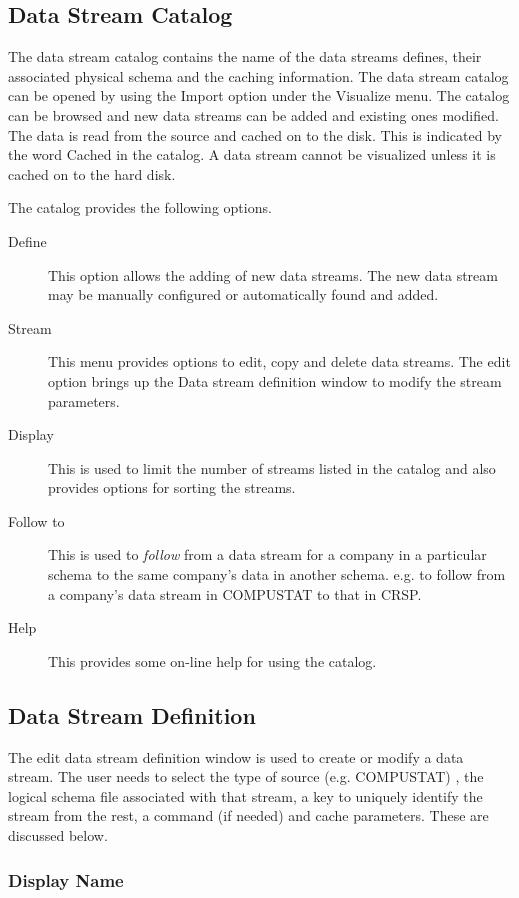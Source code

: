 \subsection{Data Stream Catalog}

The data stream catalog contains the name of the data streams defines, their associated physical schema and the caching information. The data stream catalog can be opened by using the Import option under the Visualize menu. The catalog can be browsed and new data streams can be added and existing ones modified. The data is read from the source and cached on to the disk. This is indicated by the word Cached in the catalog. A data stream cannot be visualized unless it is cached on to the hard disk.

The catalog provides the following options.
\begin{description}
\item[Define]  This option allows the adding of new data streams. The new data stream may be manually configured or automatically found and added.
\item[Stream] This menu provides options to edit, copy and delete data streams. The edit option brings up the Data stream definition window to modify the stream parameters.
\item[Display] This is used to limit the number of streams listed in the catalog and also provides options for sorting the streams.
\item[Follow to] This is used to {\em follow  } from a data stream for a company in a particular schema to the same company's data in another schema. e.g. to follow from a company's data stream in COMPUSTAT to that in CRSP.
\item[Help] This provides some on-line help for using the catalog.
\end{description}

\subsection{Data Stream Definition}

The edit data stream definition window is used to create or modify a data stream. The user needs to select the type of source (e.g. COMPUSTAT) , the logical schema file associated with that stream, a key to uniquely identify the stream from the rest, a command (if needed) and cache parameters. These are discussed below.


\subsubsection{Display Name}

